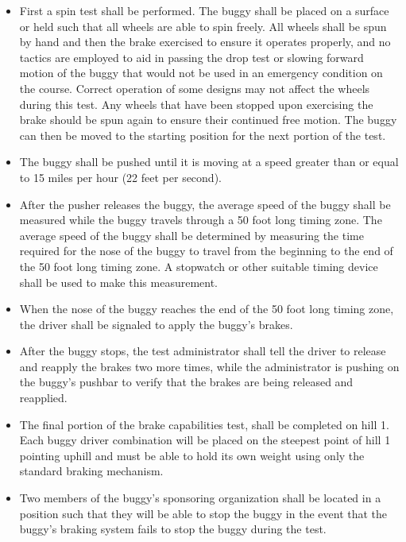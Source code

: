 	\begin{itemize}
	
		\item
		First a spin test shall be performed. The buggy shall be placed on a surface 
		or held such that all wheels are able to spin freely. All wheels shall be spun 
		by hand and then the brake exercised to ensure it operates properly, and no 
		tactics are employed to aid in passing the drop test or slowing forward motion 
		of the buggy that would not be used in an emergency condition on the course. 
		Correct operation of some designs may not affect the wheels during this test. 
		Any wheels that have been stopped upon exercising the brake should be spun 
		again to ensure their continued free motion. The buggy can then be moved to the 
		starting position for the next portion of the test.

		\item
		The buggy shall be pushed until it is moving at a speed greater than or equal
		to 15 miles per hour (22 feet per second).

		\item
		After the pusher releases the buggy, the average speed of the buggy shall be
		measured while the buggy travels through a 50 foot long timing zone. The
		average speed of the buggy shall be determined by measuring the time required
		for the nose of the buggy to travel from the beginning to the end of the 50
		foot long timing zone. A stopwatch or other suitable timing device shall be
		used to make this measurement.

		\item
		When the nose of the buggy reaches the end of the 50 foot long timing zone, the
		driver shall be signaled to apply the buggy's brakes.

		\item
		After the buggy stops, the test administrator shall tell the driver to release
		and reapply the brakes two more times, while the administrator is pushing on
		the buggy's pushbar to verify that the brakes are being released and reapplied.

		\item
		The final portion of the brake capabilities test, shall be completed on hill 1.
		Each buggy driver combination will be placed on the steepest point of hill 1
		pointing uphill and must be able to hold its own weight using only the standard
		braking mechanism.

		\item
		Two members of the buggy's sponsoring organization shall be located in a
		position such that they will be able to stop the buggy in the event that the
		buggy's braking system fails to stop the buggy during the test.
		

\end{itemize}
